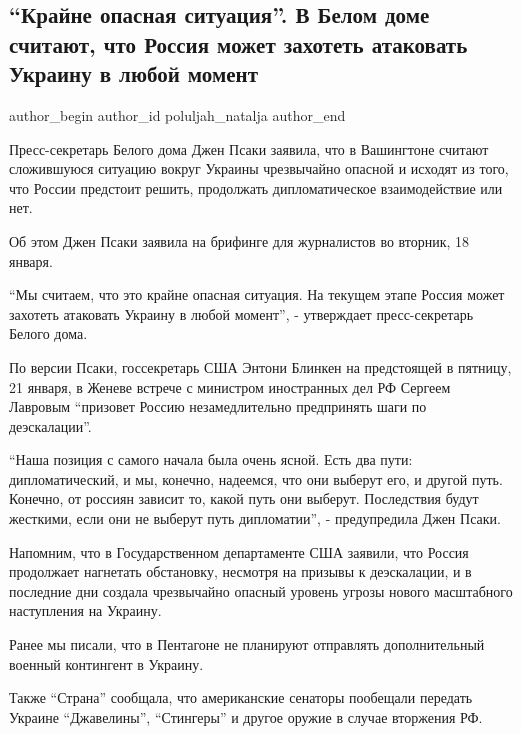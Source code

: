  
 
 
 
 
\subsection{\enquote{Крайне опасная ситуация}. В Белом доме считают, что Россия может захотеть атаковать Украину в любой момент}
\label{sec:18_01_2022.stz.news.ua.strana.1.rossia_mozhet_zahotet}

\ifcmt
 author_begin
   author_id poluljah_natalja
 author_end
\fi

Пресс-секретарь Белого дома Джен Псаки заявила, что в Вашингтоне считают
сложившуюся ситуацию вокруг Украины чрезвычайно опасной и исходят из того, что
России предстоит решить, продолжать дипломатическое взаимодействие или нет. 


Об этом Джен Псаки заявила на брифинге для журналистов во вторник, 18 января.

\enquote{Мы считаем, что это крайне опасная ситуация. На текущем этапе Россия может
захотеть атаковать Украину в любой момент}, - утверждает пресс-секретарь Белого
дома.

По версии Псаки, госсекретарь США Энтони Блинкен на предстоящей в пятницу, 21
января, в Женеве встрече с министром иностранных дел РФ Сергеем Лавровым
\enquote{призовет Россию незамедлительно предпринять шаги по деэскалации}.

\enquote{Наша позиция с самого начала была очень ясной. Есть два пути: дипломатический,
и мы, конечно, надеемся, что они выберут его, и другой путь. Конечно, от
россиян зависит то, какой путь они выберут. Последствия будут жесткими, если
они не выберут путь дипломатии}, - предупредила Джен Псаки.

Напомним, что в Государственном департаменте США заявили, что Россия продолжает
нагнетать обстановку, несмотря на призывы к деэскалации, и в последние дни
создала чрезвычайно опасный уровень угрозы нового масштабного наступления на
Украину.

Ранее мы писали, что в Пентагоне не планируют отправлять дополнительный военный
контингент в Украину.

Также \enquote{Страна} сообщала, что американские сенаторы пообещали передать Украине
\enquote{Джавелины}, \enquote{Стингеры} и другое оружие в случае вторжения РФ.
